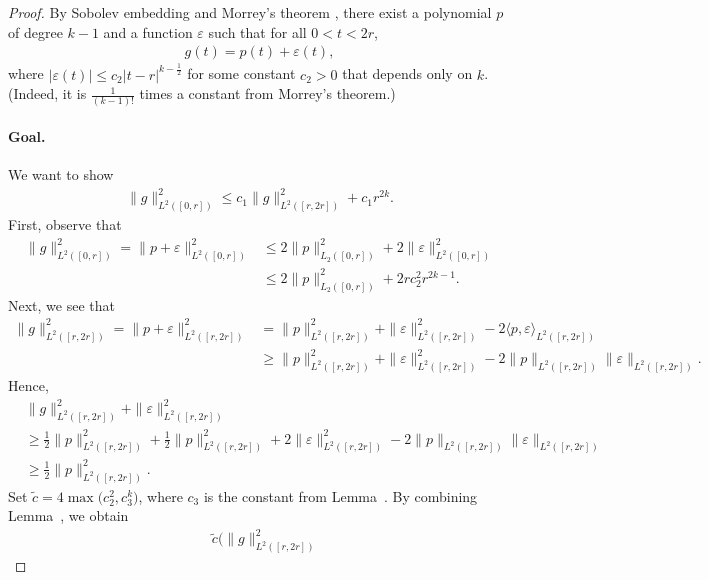 \documentclass[12pt,a4paper,pdftex,onepage]{article}
\begin{document}
\begin{proof}
By Sobolev embedding and Morrey's theorem \citep{evans2022partial}, there exist a polynomial \(p\) of degree \(k-1\) and a function \(\varepsilon\) such that for all \(0 < t < 2r\),
\begin{align*}
g(t) = p(t) + \varepsilon(t),
\end{align*}
where \(|\varepsilon(t)| \leq c_2 |t-r|^{k-\frac{1}{2}}\) for some constant \(c_2>0\) that depends only on \(k\). 
(Indeed, it is \(\frac{1}{(k-1)!}\) times a constant from Morrey's theorem.)

\paragraph{Goal.} 
We want to show
\begin{align*}
\|g \|_{L^2([0,r])}^2 
\leq c_1 \|g \|_{L^2([r,2r])}^2 
+c_1r^{2k}.
\end{align*} 
First, observe that
\begin{align}
\| g\|^2_{L^2([0,r])} =\| p + \varepsilon\|^2_{L^2([0,r])}  
&\leq 2\| p\|_{L_2([0,r])}^2 + 2\|  \varepsilon\|^2_{L^2([0,r])} 
\nonumber \\
&\leq 2\| p\|_{L_2([0,r])}^2 +2 rc_2^2 r^{2k-1}. 
\label{equation; singular propensity 1}
\end{align}
Next, we see that
\begin{align*}
\| g\|^2_{L^2([r,2r])} 
=\|p+\varepsilon \|^2_{L^2([r,2r])} 
&= \|p\|^2_{L^2([r,2r])} 
+ \|\varepsilon\|^2_{L^2([r,2r])} 
-2\langle p, \varepsilon \rangle_{L^2([r,2r])}
\\
&\geq \|p\|^2_{L^2([r,2r])} 
+ \|\varepsilon\|_{L^2([r,2r])}^2  
- 2\|p\|_{L^2([r,2r])}\|\varepsilon\|_{L^2([r,2r])}.
\end{align*}
Hence,
\begin{align*}
&\|g \|^2_{L^2([r,2r])} 
+ \|\varepsilon \|^2_{L^2([r,2r])} 
\\
&\geq \frac{1}{2}\|p\|^2_{L^2([r,2r])}  
+ \frac{1}{2}\|p\|^2_{L^2([r,2r])} 
+2\|\varepsilon \|^2_{L^2([r,2r])} 
- 2\|p\|_{L^2([r,2r])}\|\varepsilon\|_{L^2([r,2r])}
\\
&\geq \frac{1}{2}\|p\|^2_{L^2([r,2r])}.
\end{align*}
Set \(\tilde{c} =4\max\bigl(c_2^2, c_3^k\bigr)\), where \(c_3\) is the constant from Lemma~.
By combining Lemma~, we obtain
\begin{align*}
&\tilde{c} 
\bigl(\|g \|^2_{L^2([r,2r])} 

\end{align*}
\end{proof}
\end{document}
